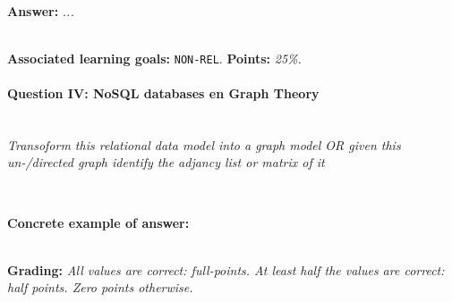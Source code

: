 \ \\ 

\textbf{Answer:} \textit{...}


\ \\ 
\textbf{Associated learning goals:} \texttt{NON-REL}.
\textbf{Points:} \textit{25\%.}
\paragraph{Question IV: NoSQL databases en Graph Theory}

\ \\ 

\textit{Transoform this relational data model into a graph model OR given this un-/directed graph identify the adjancy list or matrix of it}

\begin{lstlisting}
\end{lstlisting}

\ \\ 

\textbf{Concrete example of answer:} \textit{}

\ \\ 
\textbf{Grading:} \textit{All values are correct: full-points. At least half the values are correct: half points. Zero points otherwise.}

\ \\ 
